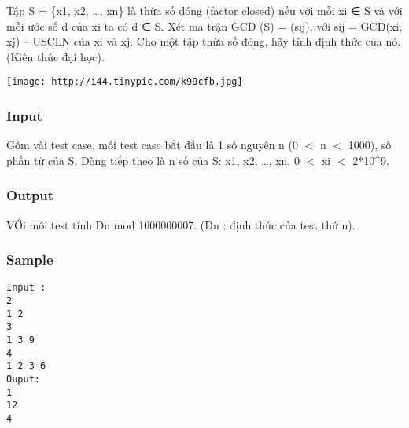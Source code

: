 



   Tập S = \{x1, x2, …, xn\} là thừa số đóng (factor closed) nếu với mỗi xi ∈ S  và với mỗi ước số d của  xi ta có d ∈ S. Xét ma trận GCD  (S) = (sij), với sij = GCD(xi, xj) – USCLN của xi và xj.  Cho một tập thừa số đóng, hãy tính định thức của nó. (Kiến thức đại học).  

\href{http://tinypic.com}{
\texttt{[image: http://i44.tinypic.com/k99cfb.jpg]}}

\subsubsection{   Input  }



   Gồm vài test case, mỗi test case bắt đầu là 1 số nguyên n (0 $<$  n $<$ 1000),  số phần tử của S. Dòng tiếp theo là n số của S: x1, x2, …, xn,  0 $<$ xi $<$ 2*10\textasciicircum9.  



\subsubsection{   Output  }



   VỚi mỗi test tính Dn mod 1000000007.  (Dn : định thức của test thứ n).  



\subsubsection{   Sample  }
\begin{verbatim}
Input :
2 
1 2 
3 
1 3 9 
4 
1 2 3 6 
Ouput: 
1 
12 
4 
\end{verbatim}